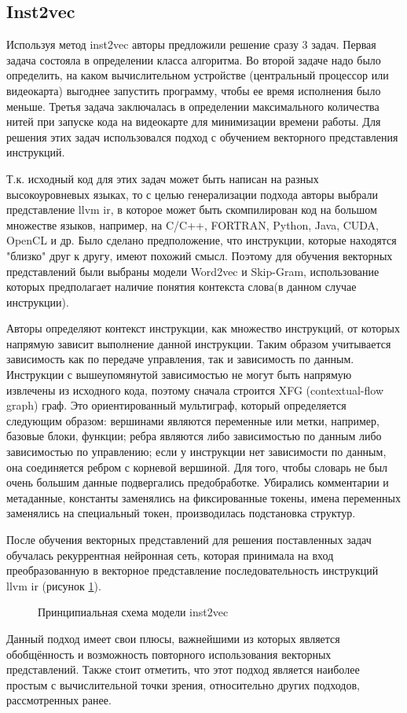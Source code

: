 \subsection{Inst2vec}
Используя метод inst2vec\cite{ncc} авторы предложили решение сразу 3 задач. Первая задача состояла в определении класса алгоритма. Во второй задаче надо было определить, на каком вычислительном устройстве (центральный процессор или видеокарта) выгоднее запустить программу, чтобы ее время исполнения было меньше. Третья задача заключалась в определении максимального количества нитей при запуске кода на видеокарте для минимизации времени работы. Для решения этих задач использовался подход с обучением векторного представления инструкций.

Т.к. исходный код для этих задач может быть написан на разных высокоуровневых языках, то с целью генерализации подхода авторы выбрали представление llvm ir, в которое может быть скомпилирован код на большом множестве языков, например, на C/C++, FORTRAN, Python, Java, CUDA, OpenCL и др. Было сделано предположение, что инструкции, которые находятся "близко" друг к другу, имеют похожий смысл. Поэтому для обучения векторных представлений были выбраны модели Word2vec\cite{DBLP:journals/corr/MikolovSCCD13} и Skip-Gram, использование которых предполагает наличие понятия контекста слова(в данном случае инструкции).

Авторы определяют контекст инструкции, как множество инструкций, от которых напрямую зависит выполнение данной инструкции. Таким образом учитывается зависимость как по передаче управления, так и зависимость по данным. Инструкции с вышеупомянутой зависимостью не могут быть напрямую извлечены из исходного кода, поэтому сначала строится XFG (contextual-flow graph) граф. Это ориентированный мультиграф, который определяется следующим образом: вершинами являются переменные или метки, например, базовые блоки, функции; ребра являются либо зависимостью по данным либо зависимостью по управлению; если у инструкции нет зависимости по данным, она соединяется ребром с корневой вершиной. Для того, чтобы словарь не был очень большим данные подвергались предобработке. Убирались комментарии и метаданные, константы заменялись на фиксированные токены, имена переменных заменялись на специальный токен, производилась подстановка структур.

После обучения векторных представлений для решения поставленных задач обучалась рекуррентная нейронная сеть, которая принимала на вход преобразованную в векторное представление последовательность инструкций llvm ir (рисунок \ref{ris:inst2vec}).
\begin{figure}[h]
    \caption{Принципиальная схема модели inst2vec}
    \label{ris:inst2vec}
\end{figure}

Данный подход имеет свои плюсы, важнейшими из которых является обобщённость и возможность повторного использования векторных представлений. Также стоит отметить, что этот подход является наиболее простым с вычислительной точки зрения, относительно других подходов, рассмотренных ранее. 
